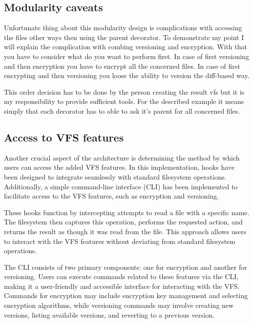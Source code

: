 \subsection{Modularity caveats}\label{subsec:modularity-cavs}

Unfortunate thing about this modularity design is complications with accessing the files other ways then using the parent decorator.
To demonstrate my point I will explain the complication with combing versioning and encryption.
With that you have to consider what do you want to perform first.
In case of first versioning and then encryption you have to encrypt all the concerned files.
In case of first encrypting and then versioning you loose the ability to version the diff-based way.

This order decision has to be done by the person creating the result vfs but it is my responsibility to provide sufficient tools.
For the described example it means simply that each decorator has to able to ask it's parent for all concerned files.

\subsection{Access to VFS features}\label{subsec:access-to-vfs-features}

Another crucial aspect of the architecture is determining the method by which users can access the added VFS features.
In this implementation, hooks have been designed to integrate seamlessly with standard filesystem operations.
Additionally, a simple command-line interface (CLI) has been implemented to facilitate access to the VFS features, such as encryption and versioning.

These hooks function by intercepting attempts to read a file with a specific name.
The filesystem then captures this operation, performs the requested action, and returns the result as though it was read from the file.
This approach allows users to interact with the VFS features without deviating from standard filesystem operations.

The CLI consists of two primary components: one for encryption and another for versioning.
Users can execute commands related to these features via the CLI, making it a user-friendly and accessible interface for interacting with the VFS\@.
Commands for encryption may include encryption key management and selecting encryption algorithms, while versioning commands may involve creating new versions, listing available versions, and reverting to a previous version.

